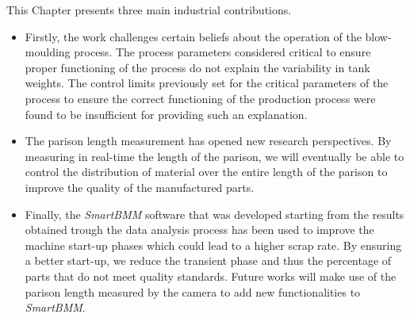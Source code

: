 This Chapter presents three main industrial contributions.
\begin{itemize}
    \item Firstly, the work challenges certain beliefs about the operation of the blow-moulding process. The process parameters considered critical to ensure proper functioning of the process do not explain the variability in tank weights. The control limits previously set for the critical parameters of the process to ensure the correct functioning of the production process were found to be insufficient for providing such an explanation.
    \item The parison length measurement has opened new research perspectives. By measuring in real-time the length of the parison, we will eventually be able to control the distribution of material over the entire length of the parison to improve the quality of the manufactured parts. 
    \item Finally, the \textit{SmartBMM} software that was developed starting from the results obtained trough the data analysis process has been used to improve the machine start-up phases which could lead to a higher scrap rate. By ensuring a better start-up, we reduce the transient phase and thus the percentage of parts that do not meet quality standards. Future works will make use of the parison length measured by the camera to add new functionalities to \textit{SmartBMM}.  
\end{itemize}


\cleardoublepage

